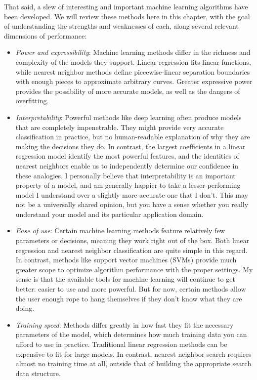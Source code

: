 \documentclass[10pt]{article}
\begin{document}
\begin{enumerate}
That said, a slew of interesting and important machine learning algorithms have been developed. We will review these methods here in this chapter, with the goal of understanding the strengths and weaknesses of each, along several relevant dimensions of performance:

\begin{itemize}
  \item \textit{Power and expressibility}: Machine learning methods differ in the richness and complexity of the models they support. Linear regression fits linear functions, while nearest neighbor methods define piecewise-linear separation boundaries with enough pieces to approximate arbitrary curves. Greater expressive power provides the possibility of more accurate models, as well as the dangers of overfitting.
  \item \textit{Interpretability}: Powerful methods like deep learning often produce models that are completely impenetrable. They might provide very accurate classification in practice, but no human-readable explanation of why they are making the decisions they do. In contrast, the largest coefficients in a linear regression model identify the most powerful features, and the identities of nearest neighbors enable us to independently determine our confidence in these analogies. I personally believe that interpretability is an important property of a model, and am generally happier to take a lesser-performing model I understand over a slightly more accurate one that I don't. This may not be a universally shared opinion, but you have a sense whether you really understand your model and its particular application domain.
  \item \textit{Ease of use}: Certain machine learning methods feature relatively few parameters or decisions, meaning they work right out of the box. Both linear regression and nearest neighbor classification are quite simple in this regard. In contrast, methods like support vector machines (SVMs) provide much greater scope to optimize algorithm performance with the proper settings. My sense is that the available tools for machine learning will continue to get better: easier to use and more powerful. But for now, certain methods allow the user enough rope to hang themselves if they don't know what they are doing.
  \item \textit{Training speed}: Methods differ greatly in how fast they fit the necessary parameters of the model, which determines how much training data you can afford to use in practice. Traditional linear regression methods can be expensive to fit for large models. In contrast, nearest neighbor search requires almost no training time at all, outside that of building the appropriate search data structure.

\end{itemize}
\end{enumerate}
\end{document}
